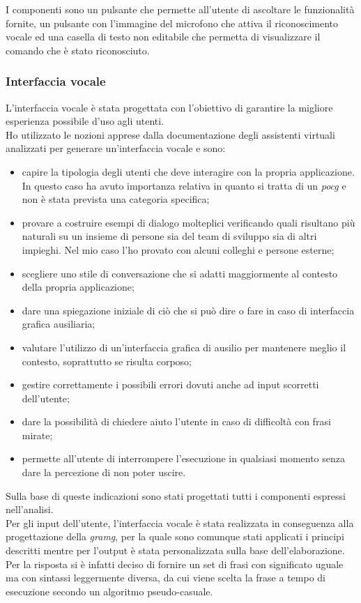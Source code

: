 		I componenti sono un pulsante che permette all'utente di ascoltare le funzionalità fornite, un pulsante con l'immagine del microfono che attiva il riconoscimento vocale ed una casella di testo non editabile che permetta di visualizzare il comando che è stato riconosciuto.		
		\subsubsection{Interfaccia vocale}
		L'interfaccia vocale è stata progettata con l'obiettivo di garantire la migliore esperienza possibile d'uso agli utenti. \\
		Ho utilizzato le nozioni apprese dalla documentazione degli assistenti virtuali analizzati per generare un'interfaccia vocale e sono:
		\begin{itemize}
			\item capire la tipologia degli utenti che deve interagire con la propria applicazione. In questo caso ha avuto importanza relativa in quanto si tratta di un \emph{\gls{pocg}} e non è stata prevista una categoria specifica;
			\item provare a costruire esempi di dialogo molteplici verificando quali risultano più naturali su un insieme di persone sia del team di sviluppo sia di altri impieghi. Nel mio caso l'ho provato con alcuni colleghi e persone esterne;
			\item scegliere uno stile di conversazione che si adatti maggiormente al contesto della propria applicazione;
			\item dare una spiegazione iniziale di ciò che si può dire o fare in caso di interfaccia grafica ausiliaria;
			\item valutare l'utilizzo di un'interfaccia grafica di ausilio per mantenere meglio il contesto, soprattutto se risulta corposo;
			\item gestire correttamente i possibili errori dovuti anche ad input scorretti dell'utente;
			\item dare la possibilità di chiedere aiuto l'utente in caso di difficoltà con frasi mirate;
			\item permette all'utente di interrompere l'esecuzione in qualsiasi momento senza dare la percezione di non poter uscire.
		\end{itemize}		
		Sulla base di queste indicazioni sono stati progettati tutti i componenti espressi nell'analisi. \\
		Per gli input dell'utente, l'interfaccia vocale è stata realizzata in conseguenza alla progettazione della \emph{\gls{gramg}}, per la quale sono comunque stati applicati i principi descritti mentre per l'output è stata personalizzata sulla base dell'elaborazione. Per la risposta si è infatti deciso di fornire un set di frasi con significato uguale ma con sintassi leggermente diversa, da cui viene scelta la frase a tempo di esecuzione secondo un algoritmo pseudo-casuale.
